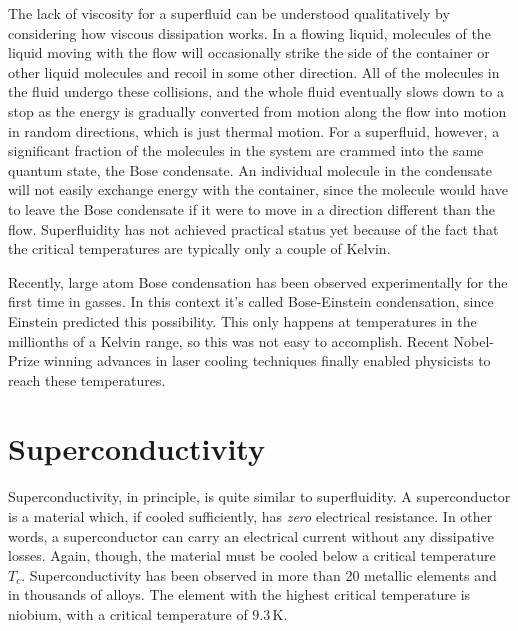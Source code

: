 The lack of viscosity for a superfluid can be understood qualitatively
by considering how viscous dissipation works.  In a flowing liquid,
molecules of the liquid moving with the flow will occasionally strike
the side of the container or other liquid molecules and recoil in some
other direction.  All of the molecules in the fluid undergo these
collisions, and the whole fluid eventually slows down to a stop as the
energy is gradually converted from motion along the flow into motion
in random directions, which is just thermal motion.  For a superfluid,
however, a significant fraction of the molecules in the system are
crammed into the same quantum state, the Bose condensate.  An
individual molecule in the condensate will not easily exchange energy
with the container, since the molecule would have to leave the Bose
condensate if it were to move in a direction different than the flow.
Superfluidity has not achieved practical status yet because of the
fact that the critical temperatures are typically only a couple of
Kelvin.

Recently, large atom Bose condensation has been observed
experimentally for the first time in gasses.  In this context it's
called Bose-Einstein condensation, since Einstein predicted this
possibility.  This only happens at temperatures in the millionths of a
Kelvin range, so this was not easy to accomplish.  Recent Nobel-Prize
winning advances in laser cooling techniques finally enabled
physicists to reach these temperatures.


\section{Superconductivity}
\label{sec:superconductivity}

Superconductivity, in principle, is quite similar to superfluidity.
A superconductor is a material which, if cooled sufficiently, has {\em
zero} electrical resistance.  In other words, a superconductor can
carry an electrical current without any dissipative losses.  Again,
though, the material must be cooled below a critical temperature $T_c$.
Superconductivity has been observed in more than 20 metallic elements
and in thousands of alloys.  The element with the highest critical
temperature is niobium, with a critical temperature of $9.3\, \mbox{K}$.

